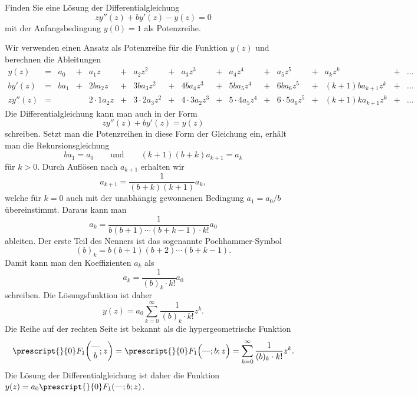 Finden Sie eine Lösung der Differentialgleichung
\[
zy''(z) + by'(z) - y(z) = 0
\]
mit der Anfangsbedingung $y(0) = 1$ als Potenzreihe.

\begin{loesung}
Wir verwenden einen Ansatz als Potenzreihe für die Funktion $y(z)$
und berechnen die Ableitungen
\[
\renewcommand{\arraycolsep}{1pt}
\begin{array}{rcrcrcrcrcrcrcrcl}
   y(z) &=&  a_0 &+&        a_1z &+&         a_2z^2 &+&         a_3z^3 &+&         a_4z^4 &+&        a_5z^5 &+&           a_kz^k &+& \dots\\
 by'(z) &=& ba_1 &+&      2ba_2z &+&       3ba_3z^2 &+&       4ba_4z^3 &+&       5ba_5z^4 &+&      6ba_6z^5 &+& (k+1)ba_{k+1}z^k &+& \dots\\
zy''(z) &=&      & & 2\cdot1a_2z &+& 3\cdot 2a_3z^2 &+& 4\cdot 3a_2z^3 &+& 5\cdot 4a_5z^4 &+& 6\cdot5a_6z^5 &+& (k+1)ka_{k+1}z^k &+& \dots
\end{array}
\]
Die Differentialgleichung kann man auch in der Form
\[
zy''(z) + by'(z) = y(z)
\]
schreiben.
Setzt man die Potenzreihen in diese Form der Gleichung ein, erhält man die
Rekursionsgleichung
\[
ba_1=a_0
\qquad\text{und}\qquad
(k+1)(b+k)a_{k+1} = a_k
\]
für $k>0$.
Durch Auflösen nach $a_{k+1}$ erhalten wir
\[
a_{k+1}
=
\frac{1}{(b+k)(k+1)} a_k,
\]
welche für $k=0$ auch mit der unabhängig gewonnenen Bedingung
$a_1=a_0/b$ übereinstimmt.
Daraus kann man
\[
a_k
=
\frac{1}{b(b+1)\cdots(b+k-1)\cdot k!} a_0
\]
ableiten.
Der erste Teil des Nenners ist das sogenannte Pochhammer-Symbol
\[
(b)_k
=
b(b+1)(b+2)\cdots (b+k-1).
\]
Damit kann man den Koeffizienten $a_k$ als
\[
a_k = \frac{1}{(b)_k\cdot k!}a_0
\]
schreiben.
Die Lösungsfunktion ist daher
\[
y(z)
=
a_0
\sum_{k=0}^\infty
\frac{1}{(b)_k\cdot k!} z^k.
\]
Die Reihe auf der rechten Seite ist bekannt als die hypergeometrische
Funktion
\[
\prescript{}{0}F_1\biggl(\begin{matrix}\text{---}\\b\end{matrix};z\biggr)
=
\prescript{}{0}F_1\Bigl(\text{---};b;z\Bigr)
=
\sum_{k=0}^\infty
\frac{1}{(b)_k\cdot k!} z^k.
\]
Die Lösung der Differentialgleichung ist daher die Funktion
$ y(z) = a_0 \prescript{}{0}F_1(\text{---};b;z)$.
\end{loesung}
